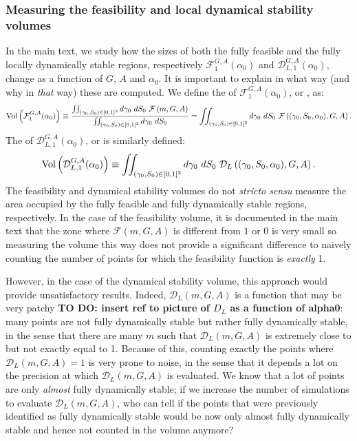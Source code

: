 \documentclass[12pt, titlepage, twoside, openright]{report}
\begin{document}
\subsubsection{Measuring the feasibility and local dynamical stability volumes}\label{app: how to measure volume}
In the main text, we study how the sizes of both the fully feasible and the fully locally dynamically stable regions, respectively $\mathcal{F}_1^{G,A}(\alpha_0)$ and $\mathcal{D}_{L,1}^{G,A}(\alpha_0)$, change as a function of $G$, $A$ and $\alpha_0$. It is important to explain in what way (and why in \textit{that} way) these are computed. We define the  of $\mathcal{F}^{G,A}_1(\alpha_0)$, or , as:
\begin{equation}
\vol{\mathcal{F}^{G,A}_1(\alpha_0)}\defined \frac{\iint_{(\gamma_0, S_0)\in[0,1]^2} d\gamma_0 \ dS_0 \ \mathcal{F}\left(m, G, A\right)}{\iint_{(\gamma_0, S_0)\in[0,1]^2} d\gamma_0 \ dS_0} = \iint_{(\gamma_0, S_0)\in[0,1]^2} d\gamma_0 \ dS_0 \ \mathcal{F}\left((\gamma_0, S_0, \alpha_0), G, A\right). \label{eq : app definition fully feasible volume of G, A}
\end{equation}
The  of $\mathcal{D}_{L,1}^{G,A}(\alpha_0)$, or  is similarly defined:
\begin{equation}
\vol{\mathcal{D}_{L,1}^{G,A}(\alpha_0)}\defined \iint_{(\gamma_0, S_0)\in[0,1]^2} d\gamma_0 \ dS_0 \ \mathcal{D}_L\left((\gamma_0, S_0, \alpha_0), G, A\right).
\end{equation}
The feasibility and dynamical stability volumes do not \textit{stricto sensu} measure the area occupied by the fully feasible and fully dynamically stable regions, respectively. In the case of the feasibility volume, it is documented in the main text that the zone where $\mathcal{F}(m, G,A)$ is different from $1$ or $0$ is very small so measuring the volume this way does not provide a significant difference to naively counting the number of points for which the feasibility function is \textit{exactly} 1.

However, in the case of the dynamical stability volume, this approach would provide unsatisfactory results. Indeed, $\mathcal{D}_{L}(m, G, A)$ is a function that may be very patchy \textbf{TO DO: insert ref to picture of $D_L$ as a function of alpha0}: many points are not fully dynamically stable but rather  fully dynamically stable, in the sense that there are many $m$ such that $\mathcal{D}_{L}(m, G, A)$ is extremely close to but not exactly equal to 1. Because of this, counting exactly the points where $\mathcal{D}_{L}(m, G, A)=1$ is very prone to noise, in the sense that it depends a lot on the precision at which $\mathcal{D}_L(m,G,A)$ is evaluated. We know that a lot of points are only \textit{almost} fully dynamically stable; if we increase the number of simulations to evaluate $\mathcal{D}_{L}(m, G, A)$, who can tell if the points that were previously identified as fully dynamically stable would be now only almost fully dynamically stable and hence not counted in the volume anymore?
\end{document}
